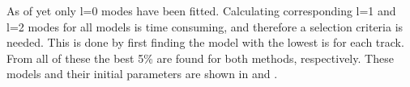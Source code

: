 

As of yet only l=0 modes have been fitted. Calculating corresponding l=1 and l=2 modes for all models is time consuming, and therefore a selection criteria is needed. This is done by first finding the model with the lowest \chis is for each track. From all of these the best 5\% are found for both methods, respectively. These models and their initial parameters are shown in  and . 

